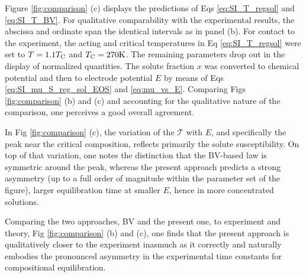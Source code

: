 \documentclass[english,aps,prb,showkeys,reprint]{revtex4-2}
\begin{document}
Figure \ref{fig:comparison} (c) displays the predictions of Eqs \ref{eq:SI_T_regsol} and \ref{eq:SI_T_BV}. For qualitative comparability with the experimental results, the abscissa and ordinate span the identical intervals as in panel (b). For contact to the experiment, the acting and critical temperatures in Eq \ref{eq:SI_T_regsol} were set to $T = 1.1 T_{\rm C}$ and $T_{\rm C} = \rm 270 K$. The remaining parameters drop out in the display of normalized quantities. The solute fraction $x$ was converted to chemical potential and then to electrode potential $E$ by means of Eqs \ref{eq:SI_mu_S_reg_sol_EOS} and \ref{eq:mu_vs_E}. Comparing Figs \ref{fig:comparison} (b) and (c) and accounting for the qualitative nature of the comparison, one perceives a good overall agreement.

In Fig \ref{fig:comparison} (c), the variation of the $\mathcal T$ with $E$, and specifically the peak near the critical composition, reflects primarily the solute susceptibility. On top of that variation, one notes the distinction that the BV-based law is symmetric around the peak, whereas the present approach predicts a strong asymmetry (up to a full order of magnitude within the parameter set of the figure), larger equilibration time at smaller $E$, hence in more concentrated solutions.

Comparing the two approaches, BV and the present one, to experiment and theory, Fig \ref{fig:comparison} (b) and (c), one finds that the present approach is qualitatively closer to the experiment inasmuch as it correctly and naturally embodies the pronounced asymmetry in the experimental time constants for compositional equilibration.
\end{document}
